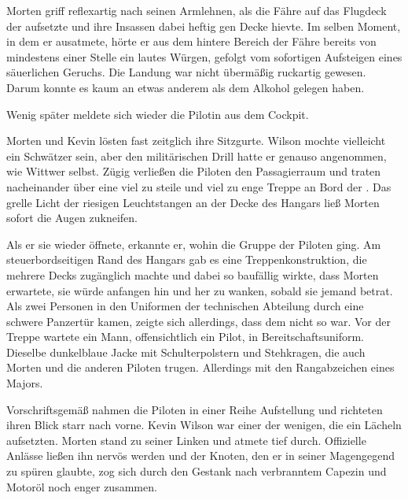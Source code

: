 \par

Morten griff reflexartig nach seinen Armlehnen, als die Fähre auf das Flugdeck der  aufsetzte und ihre Insassen dabei heftig gen Decke hievte. Im selben Moment, in dem er ausatmete, hörte er aus dem hintere Bereich der Fähre bereits von mindestens einer Stelle ein lautes Würgen, gefolgt vom sofortigen Aufsteigen eines säuerlichen Geruchs. Die Landung war nicht übermäßig ruckartig gewesen. Darum konnte es kaum an etwas anderem als dem Alkohol gelegen haben.

\par

Wenig später meldete sich wieder die Pilotin aus dem Cockpit. 

\par

Morten und Kevin lösten fast zeitglich ihre Sitzgurte. Wilson mochte vielleicht ein Schwätzer sein, aber den militärischen Drill hatte er genauso angenommen, wie Wittwer selbst. Zügig verließen die Piloten den Passagierraum und traten nacheinander über eine viel zu steile und viel zu enge Treppe an Bord der . Das grelle Licht der riesigen Leuchtstangen an der Decke des Hangars ließ Morten sofort die Augen zukneifen.

\par

Als er sie wieder öffnete, erkannte er, wohin die Gruppe der Piloten ging. Am steuerbordseitigen Rand des Hangars gab es eine Treppenkonstruktion, die mehrere Decks zugänglich machte und dabei so baufällig wirkte, dass Morten erwartete, sie würde anfangen hin und her zu wanken, sobald sie jemand betrat. Als zwei Personen in den Uniformen der technischen Abteilung durch eine schwere Panzertür kamen, zeigte sich allerdings, dass dem nicht so war. Vor der Treppe wartete ein Mann, offensichtlich ein Pilot, in Bereitschaftsuniform. Dieselbe dunkelblaue Jacke mit Schulterpolstern und Stehkragen, die auch Morten und die anderen Piloten trugen. Allerdings mit den Rangabzeichen eines Majors.

\par

Vorschriftsgemäß nahmen die Piloten in einer Reihe Aufstellung und richteten ihren Blick starr nach vorne. Kevin Wilson war einer der wenigen, die ein Lächeln aufsetzten. Morten stand zu seiner Linken und atmete tief durch. Offizielle Anlässe ließen ihn nervös werden und der Knoten, den er in seiner Magengegend zu spüren glaubte, zog sich durch den Gestank nach verbranntem Capezin und Motoröl noch enger zusammen.

